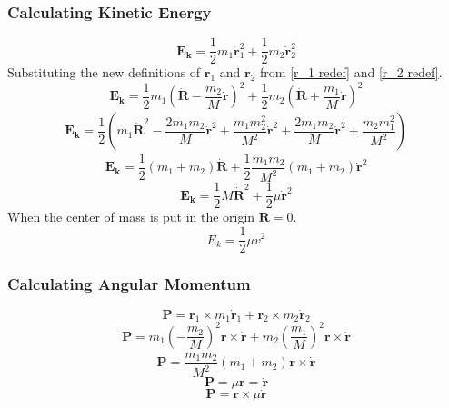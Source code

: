 \documentclass[reprint,english,notitlepage]{revtex4-2}
\begin{document}
		\subsubsection{Calculating Kinetic Energy}\label{E_k calc}
			\[
				\mathbf{E_k} = \frac{1}{2}m_1 \mathbf{\dot{r}}_{1}^{2} + \frac{1}{2}m_2 \mathbf{\dot{r}}_{2}^{2}
			\]
			Substituting the new definitions of $ \mathbf{r}_1 $ and $ \mathbf{r}_2 $ from \ref{r_1 redef} and  \ref{r_2 redef}.
			\[
			\mathbf{E_k} = \frac{1}{2} m_1 \left(\mathbf{\dot{R}} - \frac{m_2}{M}\mathbf{\dot{r}}\right)_{}^{2} + \frac{1}{2} m_2 \left(\mathbf{\dot{R}} + \frac{m_1}{M} \mathbf{\dot{r}}\right)_{}^{2}
			\]
			\[
			\mathbf{E_k} = \frac{1}{2} \left(m_1 \mathbf{\dot{R}}^{2} - \frac{2m_1 m_2}{M}\mathbf{\dot{r}}^{2} + \frac{m_1m_2^{2}}{M^{2}}\mathbf{\dot{r}}^{2} + \frac{2m_1m_2}{M}\mathbf{\dot{r}}^{2} + \frac{m_2m_1^{2}}{M^{2}}\right)_{}^{}
			\]
			\[
			\mathbf{E_k} = \frac{1}{2}\left( m_1 + m_2 \right) \mathbf{\dot{R}} + \frac{1}{2} \frac{m_1m_2}{M^{2}} \left( m_1+ m_2  \right) \mathbf{\dot{r}}^{2}
			\]
			\[
			\mathbf{E_k} = \frac{1}{2} M \mathbf{\dot{R}}^{2} + \frac{1}{2} μ \mathbf{\dot{r}}^{2}
			\]
			When the center of mass is put in the origin $ \mathbf{R} = 0 $.
			\[
			E_k = \frac{1}{2} μ v^{2}
			\]


		\subsubsection{Calculating Angular Momentum}\label{AM calc}
			\[
			\mathbf{P} = \mathbf{r}_1 × m_1 \mathbf{\dot{r}}_1 + \mathbf{r}_2 × m_2 \mathbf{\dot{r}}_2 
			\]
			\[
			\mathbf{P} = m_1 \left(- \frac{m_2}{M}\right)_{}^{2}\mathbf{r} × \mathbf{\dot{r}} + m_2 \left(\frac{m_1}{M}\right)_{}^{2} \mathbf{r} × \mathbf{\dot{r}}
			\]
			\[
			\mathbf{P} = \frac{m_1m_2}{M^{2}} \left(m_1 + m_2\right)_{}^{} \mathbf{r} × \mathbf{\dot{r}} 
			\]
			\[
			\mathbf{P} = μ \mathbf{r} = \mathbf{\dot{r}}
			\]
			\[
			\mathbf{P} = \mathbf{r} × μ \mathbf{\dot{r}}
			\]




\newpage
\end{document}
